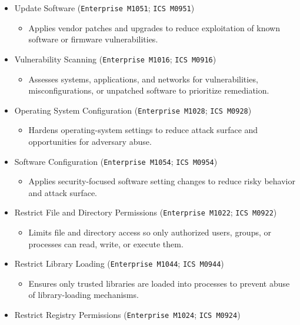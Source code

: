 \documentclass[10pt,a4paper,oneside]{report}
\begin{document}
\begin{itemize}
\begin{itemize}
\begin{itemize}
\item Detects, blocks, or mitigates conditions that indicate or enable software exploitation.
\end{itemize}
\item Update Software (\texttt{Enterprise M1051}; \texttt{ICS M0951})
\begin{itemize}
\item Applies vendor patches and upgrades to reduce exploitation of known software or firmware vulnerabilities.
\end{itemize}
\item Vulnerability Scanning (\texttt{Enterprise M1016}; \texttt{ICS M0916})
\begin{itemize}
\item Assesses systems, applications, and networks for vulnerabilities, misconfigurations, or unpatched software to prioritize remediation.
\end{itemize}
\item Operating System Configuration (\texttt{Enterprise M1028}; \texttt{ICS M0928})
\begin{itemize}
\item Hardens operating-system settings to reduce attack surface and opportunities for adversary abuse.
\end{itemize}
\item Software Configuration (\texttt{Enterprise M1054}; \texttt{ICS M0954})
\begin{itemize}
\item Applies security-focused software setting changes to reduce risky behavior and attack surface.
\end{itemize}
\item Restrict File and Directory Permissions (\texttt{Enterprise M1022}; \texttt{ICS M0922})
\begin{itemize}
\item Limits file and directory access so only authorized users, groups, or processes can read, write, or execute them.
\end{itemize}
\item Restrict Library Loading (\texttt{Enterprise M1044}; \texttt{ICS M0944})
\begin{itemize}
\item Ensures only trusted libraries are loaded into processes to prevent abuse of library-loading mechanisms.
\end{itemize}
\item Restrict Registry Permissions (\texttt{Enterprise M1024}; \texttt{ICS M0924})

\end{itemize}
\end{itemize}
\end{document}
